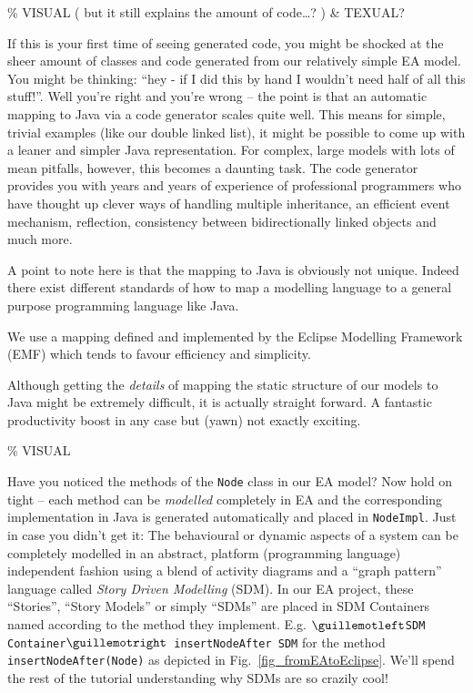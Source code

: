 \% VISUAL ({ \small but it still explains the amount of code\ldots? }) \& TEXUAL?

If this is your first time of seeing generated code, you might be shocked at the sheer amount of classes and code generated from our relatively simple EA model.  
You might be thinking: ``hey - if I did this by hand I wouldn't need half of all this stuff!''.  
Well you're right and you're wrong -- the point is that an automatic mapping to Java via a code generator scales quite well.
This means for simple, trivial examples (like our double linked list), it might be possible to come up with a leaner and simpler Java representation.  
For complex, large models with lots of mean pitfalls, however, this becomes a daunting task.  
The code generator provides you with years and years of experience of professional programmers who have thought up clever ways of handling multiple inheritance, an efficient event mechanism, reflection, consistency between bidirectionally linked objects and much more.

A point to note here is that the mapping to Java is obviously not unique. 
Indeed there exist different standards of how to map a modelling language to a general purpose programming language like Java. 

We use a mapping defined and implemented by the Eclipse Modelling Framework (EMF) which tends to favour efficiency and simplicity.

Although getting the \emph{details} of mapping the static structure of our models to Java might be extremely difficult, it is actually straight forward.  
A fantastic productivity boost in any case but (yawn) not exactly exciting.


\% VISUAL

Have you noticed the methods of the \texttt{Node} class in our EA model? 
Now hold on tight -- each method can be \emph{modelled} completely in EA and the corresponding implementation in Java is generated automatically and placed in \texttt{NodeImpl}.  
Just in case you didn't get it: The behavioural or dynamic aspects of a system can be completely modelled in an abstract, platform (programming language) independent fashion using a blend of activity  diagrams and a ``graph pattern'' language called \textit{Story Driven Modelling} (SDM).  
In our EA project, these ``Stories'', ``Story Models'' or simply ``SDMs'' are  placed in SDM Containers named according to the method they implement.  
E.g.  \texttt{$\guillemotleft$SDM Container$\guillemotright$ insertNodeAfter SDM} for the method  \texttt{insertNodeAfter(Node)} as depicted in
Fig.~\ref{fig_fromEAtoEclipse}.  
We'll spend the rest of the tutorial understanding why SDMs are so  {\huge crazily} cool!
 

